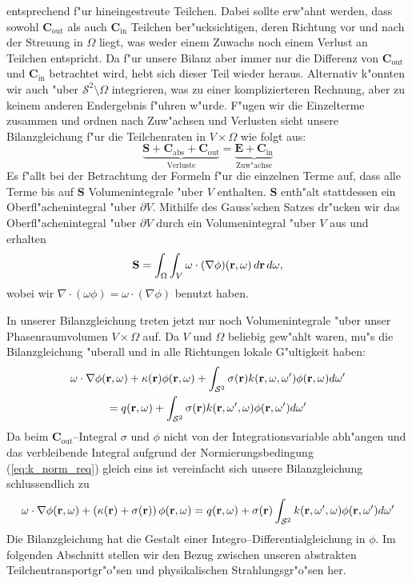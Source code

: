 	entsprechend f"ur hineingestreute Teilchen. Dabei sollte erw"ahnt werden, dass sowohl $\mathbf{C}_\text{out}$ als auch $\mathbf{C}_\text{in}$ Teilchen ber"ucksichtigen, deren Richtung vor und nach der Streuung in $\Omega$ liegt, was weder einem Zuwachs noch einem Verlust an Teilchen entspricht. Da f"ur unsere Bilanz aber immer nur die Differenz von $\mathbf{C}_\text{out}$ und $\mathbf{C}_\text{in}$ betrachtet wird, hebt sich dieser Teil wieder heraus. Alternativ k"onnten wir auch "uber $\mathcal{S}^2 \setminus \Omega$ integrieren, was zu einer komplizierteren Rechnung, aber zu keinem anderen Endergebnis f"uhren w"urde. F"ugen wir die Einzelterme zusammen und ordnen nach Zuw"achsen und Verlusten sieht unsere Bilanzgleichung f"ur die Teilchenraten in $V \times \Omega$ wie folgt aus:
	$$\underbrace{\mathbf{S}+\mathbf{C}_\text{abs}+\mathbf{C}_\text{out}}_\text{Verluste}=\underbrace{\mathbf{E}+\mathbf{C}_\text{in}}_\text{Zuw"achse}$$
	Es f"allt bei der Betrachtung der Formeln f"ur die einzelnen Terme auf, dass alle Terme bis auf $\mathbf{S}$ Volumenintegrale "uber $V$ enthalten. $\mathbf{S}$ enth"alt stattdessen ein Oberfl"achenintegral "uber $\partial V$. Mithilfe des Gauss'schen Satzes dr"ucken wir das Oberfl"achenintegral "uber $\partial V$ durch ein Volumenintegral "uber $V$ aus und erhalten
	$$\mathbf{S}=\int_\Omega \int_V \omega \cdot (\nabla\phi)(\mathbf{r},\omega)\,d\mathbf{r}\,d\omega,$$
	wobei wir $\nabla \cdot(\omega\phi)=\omega\cdot(\nabla\phi)$ benutzt haben.
	
	In unserer Bilanzgleichung treten jetzt nur noch Volumenintegrale "uber unser Phasenraumvolumen $V \times \Omega$ auf. Da $V$ und $\Omega$ beliebig gew"ahlt waren, mu"s die Bilanzgleichung "uberall und in alle Richtungen lokale G"ultigkeit haben:
	\begin{multline*}
	  \omega\cdot\nabla\phi(\mathbf{r},\omega)+\kappa(\mathbf{r})\phi(\mathbf{r},\omega)+\int_{\mathcal{S}^2}\sigma(\mathbf{r})k(\mathbf{r},\omega,\omega')\phi(\mathbf{r},\omega)d\omega' \\
	  =q(\mathbf{r},\omega)+\int_{\mathcal{S}^2}\sigma(\mathbf{r})k(\mathbf{r},\omega',\omega)\phi(\mathbf{r},\omega')d\omega'
	\end{multline*}
	Da beim $\mathbf{C}_\text{out}$--Integral $\sigma$ und $\phi$ nicht von der Integrationsvariable abh"angen und das verbleibende Integral aufgrund der Normierungsbedingung (\ref{eq:k_norm_req}) gleich eins ist vereinfacht sich unsere Bilanzgleichung schlussendlich zu
	\begin{equation}\label{eq:particle_balance_equation}
	  \omega\cdot\nabla\phi(\mathbf{r},\omega)+\left(\kappa(\mathbf{r})+\sigma(\mathbf{r})\right)\phi(\mathbf{r},\omega)
	  =q(\mathbf{r},\omega)+\sigma(\mathbf{r})\int_{\mathcal{S}^2}k(\mathbf{r},\omega',\omega)\phi(\mathbf{r},\omega')d\omega'
	\end{equation}
	Die Bilanzgleichung hat die Gestalt einer Integro--Differentialgleichung in $\phi$.
	Im folgenden Abschnitt stellen wir den Bezug zwischen unseren abstrakten Teilchentransportgr"o"sen und physikalischen Strahlungsgr"o"sen her.

